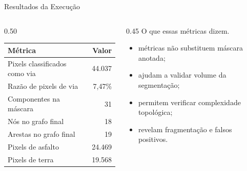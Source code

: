 \documentclass[aspectratio=169,11pt]{beamer}
\begin{document}
\begin{frame}{Resultados da Execução}
    \begin{columns}[T,totalwidth=\textwidth]
        \begin{column}{0.50\textwidth}
            \begin{table}
                \small
                \begin{tabular}{lr}
                    \toprule
                    Métrica & Valor \\
                    \midrule
                    Pixels classificados como via & 44.037 \\
                    Razão de pixels de via & 7,47\% \\
                    Componentes na máscara & 31 \\
                    Nós no grafo final & 18 \\
                    Arestas no grafo final & 19 \\
                    Pixels de asfalto & 24.469 \\
                    Pixels de terra & 19.568 \\
                    \bottomrule
                \end{tabular}
            \end{table}
        \end{column}
        \begin{column}{0.45\textwidth}
            \large O que essas métricas dizem.
            \vspace{0.25cm}

            \small
            \begin{itemize}
                \item métricas não substituem máscara anotada;
                \item ajudam a validar volume da segmentação;
                \item permitem verificar complexidade topológica;
                \item revelam fragmentação e falsos positivos.
            \end{itemize}
        \end{column}
    \end{columns}
\end{frame}
\end{document}
